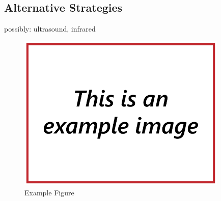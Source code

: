 \subsection{\label{sec:intro:alternatives}Alternative Strategies}
possibly: ultrasound, infrared

\begin{figure}
\includegraphics[width=100mm,natwidth=640,natheight=480]{"./image/Example"}
\caption{\label{fig:example}Example Figure}
\end{figure}
